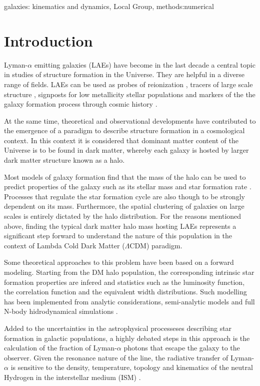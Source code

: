 \documentclass[usenatbib]{mn2e}
\begin{document}
\begin{keywords}
{galaxies: kinematics and dynamics, Local Group, methods:numerical}
\end{keywords}


\section{Introduction}

Lyman-$\alpha$ emitting galaxies (LAEs) have become in the last decade a 
central topic in studies of structure formation in the Universe. They 
are helpful in a diverse range of fields. LAEs can
be used as probes of reionization \citep{Dijkstra11}, tracers of
large scale structure \citep{Koehler2007}, 
signposts for low metallicity stellar populations and markers of the
the galaxy formation process through cosmic history \citep{ForeroRomero2012}.  


At the same time, theoretical and observational developments have
contributed to the emergence of a paradigm to describe structure
formation in a cosmological context. In this context it is considered
that dominant matter content of the Universe is to be found in dark
matter, whereby each galaxy is hosted by larger dark matter structure
known as a halo. 

Most models of galaxy formation find that the mass of the halo can be
used to predict properties of the galaxy such as its stellar mass and
star formation rate \citep{Behroozi2012}. Processes that regulate the
star formation cycle are also though to be strongly dependent on its
mass. Furthermore, the spatial clustering of galaxies on large scales
is entirely dictated by the halo distribution.  For the reasons
mentioned above, finding the typical dark matter halo mass hosting
LAEs represents a significant step forward to understand the nature of
this population in the context of Lambda Cold Dark Matter
($\Lambda$CDM) paradigm.  

Some theoretical approaches to this problem have been based on a
forward modeling. Starting from the DM halo population, the
corresponding intrinsic star formation properties are infered and
statistics such as the luminosity function, the correlation function
and the equivalent width distributions. Such modelling has been
implemented from analytic considerations, semi-analytic models
 and 
full N-body hidrodynamical simulations
\citep{Dayal2009, ForeroRomero2011, Yajima2012, ForeroRomero2012} . 

Added to the uncertainties in the astrophysical processeses describing
star formation in galactic populations, a highly debated steps in this
approach is the calculation of the fraction of Lyman-$\alpha$ photons
that escape the galaxy to the observer. Given the resonance nature of
the line, the radiative transfer of Lyman-$\alpha$ is sensitive to the
density, temperature, topology and kinematics of the neutral Hydrogen
in the interstellar medium (ISM) \citep{Neufeld1991, ForeroRomero2011,
Laursen2013}.  
\end{document}
